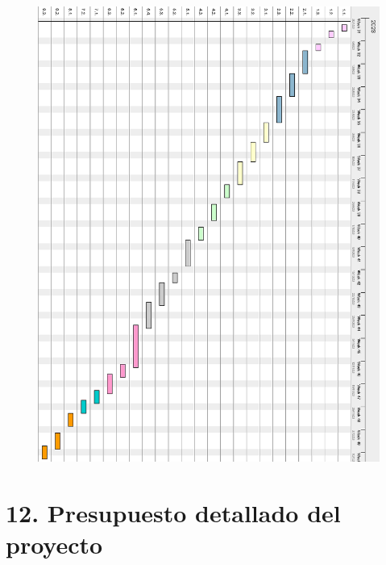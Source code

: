 \documentclass[
11pt, %
codirector, %
]{charter}
\begin{document}
\begin{figure}[htpb]
\centering 

\includegraphics[height=0.78\textheight]{./Figuras/ganttRotado5.png}


\label{fig:diagGantt}
\end{figure}
\pagebreak

\section{12. Presupuesto detallado del proyecto}
\label{sec:presupuesto}
\end{document}
